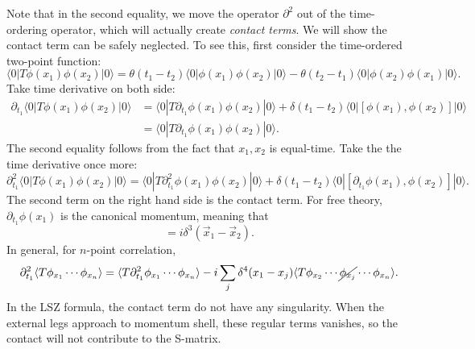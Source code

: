 Note that in the second equality, we move the operator $\partial^2$ out of the time-ordering operator, which will actually create \textit{contact terms}.
We will show the contact term can be safely neglected.
To see this, first consider the time-ordered two-point function:
\begin{equation}
	\langle 0|T\phi(x_1)\phi(x_2)|0\rangle
	= \theta(t_1-t_2)\langle 0|\phi(x_1)\phi(x_2)|0\rangle -
	\theta(t_2-t_1)\langle 0|\phi(x_2)\phi(x_1)|0\rangle.
\end{equation}	
Take time derivative on both side:
\begin{equation*}
\begin{aligned}
	\partial_{t_1} \langle 0|T\phi(x_1)\phi(x_2)|0\rangle
	&= \langle 0|T\partial_{t_1}\phi(x_1)\phi(x_2)|0\rangle +
	\delta(t_1-t_2)\langle 0|[\phi(x_1),\phi(x_2)]|0\rangle \\
	&= \langle 0|T\partial_{t_1}\phi(x_1)\phi(x_2)|0\rangle.
\end{aligned}
\end{equation*}
The second equality follows from the fact that $x_1,x_2$ is equal-time.
Take the the time derivative once more:
\begin{equation*}
	\partial^2_{t_1} \langle 0|T\phi(x_1)\phi(x_2)|0\rangle
	= \langle 0|T\partial^2_{t_1}\phi(x_1)\phi(x_2)|0\rangle +
	\delta(t_1-t_2)\langle 0|[\partial_{t_1}\phi(x_1),\phi(x_2)]|0\rangle.
\end{equation*}
The second term on the right hand side is the contact term.
For free theory, $\partial_{t_1}\phi(x_1)$ is the canonical momentum, meaning that
\begin{equation}
	[\phi(\vec x_1, t),\partial_{t}\phi(\vec x_1,t)] = i \delta^{3}(\vec x_1-\vec x_2).
\end{equation}
In general, for $n$-point correlation,
\begin{equation}
\begin{aligned}
	 \partial_{t_1}^2 \langle T\phi_{x_1}\cdots\phi_{x_n} \rangle
	= \langle T\partial_{t_1}^2\phi_{x_1}\cdots\phi_{x_n}\rangle -i \sum_j \delta^4(x_1-x_j)\langle T\phi_{x_2}\cdots\cancel{\phi_{x_j}}\cdots\phi_{x_n}\rangle.
\end{aligned}
\end{equation}
In the LSZ formula, the contact term do not have any singularity.
When the external legs approach to momentum shell, these regular terms vanishes, so the contact will not contribute to the S-matrix.







